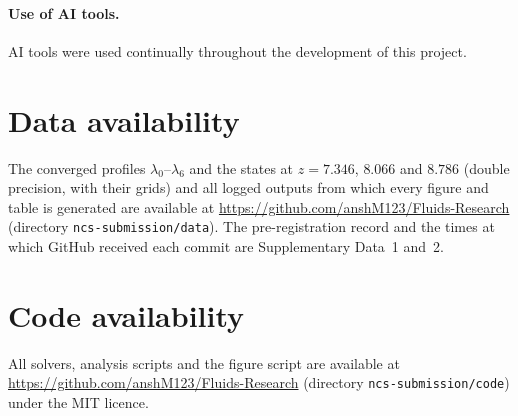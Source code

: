 \documentclass[11pt]{article}
\begin{document}
\paragraph{Use of AI tools.} AI tools were used continually throughout the development of this project.

\section*{Data availability}
The converged profiles $\lambda_0$--$\lambda_6$ and the states at $z=7.346$, $8.066$ and $8.786$ (double precision,
with their grids) and all logged outputs from which every figure and table is generated are available at
\url{https://github.com/anshM123/Fluids-Research} (directory \texttt{ncs-submission/data}). The pre-registration
record and the times at which GitHub received each commit are Supplementary Data~1 and~2.

\section*{Code availability}
All solvers, analysis scripts and the figure script are available at \url{https://github.com/anshM123/Fluids-Research}
(directory \texttt{ncs-submission/code}) under the MIT licence.
\end{document}
